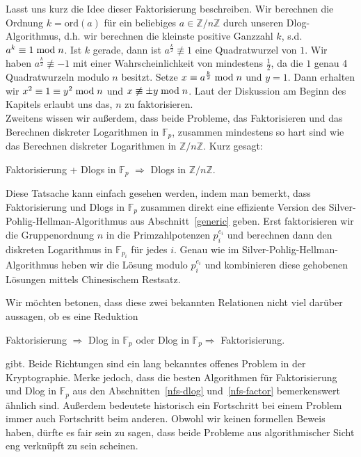 \begin{refsegment}
Lasst uns kurz die Idee dieser Faktorisierung beschreiben. Wir berechnen die Ordnung $k=\textrm{ord}(a)$ für ein beliebiges $a \in \mathbb{Z}/n\mathbb{Z}$ durch unseren Dlog-Algorithmus, d.h. wir berechnen die kleinste positive Ganzzahl $k$, s.d. $a^{k} \equiv 1 \hspace{1mm}{\rm mod}\hspace{1mm} n$. Ist $k$ gerade, dann ist $a^{\frac k 2} \not\equiv 1$ eine Quadratwurzel von $1$. Wir haben $a^{\frac k 2} \not\equiv -1$ mit einer Wahrscheinlichkeit von mindestens $\frac 1 2$, da die $1$ genau 4 Quadratwurzeln modulo $n$ besitzt. Setze $x \equiv a^{\frac k 2} \hspace{1mm}{\rm mod}\hspace{1mm} n$ und $y = 1$. Dann erhalten wir $x^2 \equiv 1 \equiv y^2 \hspace{1mm}{\rm mod}\hspace{1mm} n$ und $x \not \equiv \pm y \hspace{1mm}{\rm mod}\hspace{1mm} n$. Laut der Diskussion am Beginn des Kapitels erlaubt uns das, $n$ zu faktorisieren.\\[0.1cm]

Zweitens wissen wir außerdem, dass beide Probleme, das Faktorisieren und das Berechnen diskreter Logarithmen in $\mathbb{F}_p$, zusammen mindestens so hart sind wie das Berechnen diskreter Logarithmen in $\mathbb{Z}/n\mathbb{Z}$. Kurz gesagt:
\begin{center}
  Faktorisierung + Dlogs in $\mathbb{F}_p$ $\Rightarrow$ Dlogs in $\mathbb{Z}/n\mathbb{Z}$.
\end{center}
Diese Tatsache kann einfach gesehen werden, indem man bemerkt, dass Faktorisierung und Dlogs in $\mathbb{F}_p$ zusammen direkt eine effiziente Version des Silver-Pohlig-Hellman-Algorithmus aus Abschnitt~\ref{generic} geben. Erst faktorisieren wir die Gruppenordnung $n$ in die Primzahlpotenzen $p_i^{e_i}$ und berechnen dann den diskreten Logarithmus in $\mathbb{F}_{p_i}$ für jedes $i$. Genau wie im Silver-Pohlig-Hellman-Algorithmus heben wir die Lösung modulo $p_i^{e_i}$ und kombinieren diese gehobenen Lösungen mittels Chinesischem Restsatz.

Wir möchten betonen, dass diese zwei bekannten Relationen nicht viel darüber aussagen, ob es eine Reduktion
\begin{center}
  Faktorisierung $\Rightarrow$ Dlog in $\mathbb{F}_p$ \hskip 1cm oder \hskip 1cm Dlog in $\mathbb{F}_p \Rightarrow $ Faktorisierung.
\end{center}
gibt.
Beide Richtungen sind ein lang bekanntes offenes Problem in der Kryptographie. Merke jedoch, dass die besten Algorithmen für Faktorisierung und Dlog in $\mathbb{F}_p$ aus den Abschnitten~\ref{nfs-dlog} und~\ref{nfs-factor} bemerkenswert ähnlich sind. Außerdem bedeutete historisch ein Fortschritt bei einem Problem immer auch Fortschritt beim anderen. Obwohl wir keinen formellen Beweis haben, dürfte es fair sein zu sagen, dass beide Probleme aus algorithmischer Sicht eng verknüpft zu sein scheinen.



\end{refsegment}
